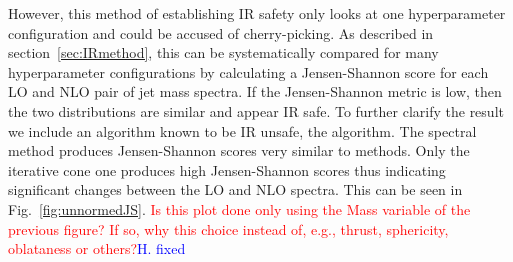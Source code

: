 \begin{figure}[htp]
\end{figure}    

%
%
However, this method of establishing IR safety only looks at one hyperparameter configuration and could be accused of cherry-picking.
As described in section~\ref{sec:IRmethod}, this can be systematically compared for many hyperparameter configurations by calculating a Jensen-Shannon
score for each LO and NLO pair of jet mass spectra.
If the Jensen-Shannon metric is low, then the two distributions are similar and appear IR safe.
To further clarify the result we include an algorithm known to be IR unsafe, the \itercone{} algorithm.
The spectral method produces Jensen-Shannon scores very similar to \genkt{} methods. Only the iterative cone one produces high Jensen-Shannon scores thus indicating significant changes between the LO and NLO spectra.
This can be seen in Fig.~\ref{fig:unnormedJS}. {\textcolor{red}{Is this plot done only using the Mass variable of the previous figure? If so, why this choice instead of, e.g., thrust, sphericity, oblataness or others?}\textcolor{blue}{H. fixed}}

